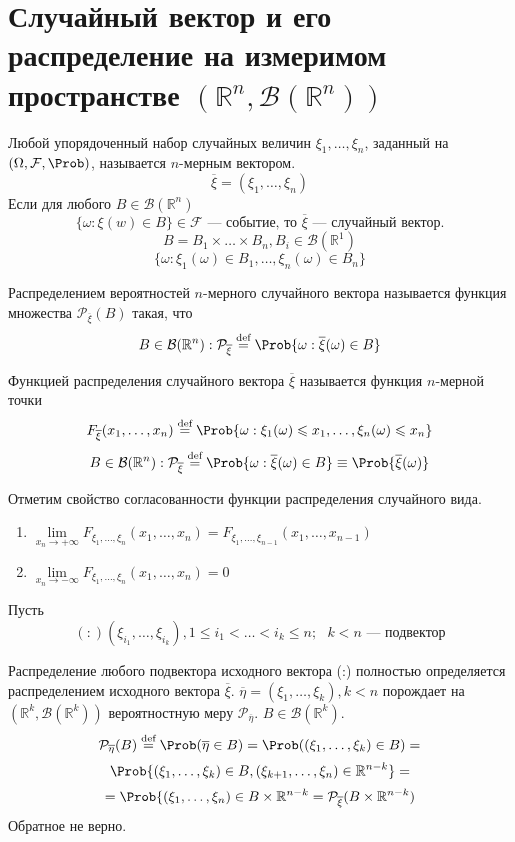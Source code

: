 \section{Случайный вектор и его распределение на измеримом пространстве $(\mathbb{R}^n, \mathcal{B}(\mathbb{R}^n))$}
\begin{definition}
	Любой упорядоченный набор случайных величин $\xi_1, \ldots, \xi_n$, заданный на $(\Omega, \mathcal{F}, \Prob)$, называется $n$-мерным вектором.
	\[
		\overline{\xi} = (\xi_1, \ldots, \xi_n)
	\]
	Если для любого $B \in \mathcal{B}(\mathbb{R}^n)$
	\[
		\{ \omega: \xi (w) \in B \} \in \mathcal{F} \text{ --- событие, то $\overline{\xi}$ --- случайный вектор.}
	\]
	\[
		B = B_1 \times \ldots \times B_n, B_i \in \mathcal{B} (\mathbb{R}^1)
	\]
	\[
		\{ \omega : \xi_1 (\omega) \in B_1, \ldots, \xi_n (\omega) \in B_n \}
	\]
\end{definition}
\begin{definition}
	Распределением вероятностей $n$-мерного случайного вектора называется функция множества $\mathcal{P}_{\overline{\xi}} (B)$ такая, что
	\[
		B \in \mathcal{B} (\mathbb{R}^n) : \mathcal{P}_{\overline{\xi}} \overset{\textrm{def}}{=} \Prob \{ \omega : \overline{\xi} (\omega) \in B \}
	\]
\end{definition}
\begin{definition}
	Функцией распределения случайного вектора $\overline{\xi}$ называется функция $n$-мерной точки
	\[
		F_{\overline{\xi}} (x_1, \ldots, x_n) \overset{\textrm{def}}{=} \Prob \{\omega : \xi_1 (\omega) \leqslant x_1, \ldots, \xi_n (\omega) \leqslant x_n \}
	\]
	\[
		B \in \mathcal{B} (\mathbb{R}^n) : \mathcal{P}_{\overline{\xi}} \overset{\textrm{def}}{=} \Prob \{ \omega : \overline{\xi} (\omega) \in B \} \equiv \Prob \{ \overline{\xi} (\omega) \}
	\]
\end{definition}
Отметим свойство согласованности функции распределения случайного вида.
\begin{enumerate}
	\item $\lim\limits_{x_n \to +\infty} F_{\xi_1, \ldots, \xi_n} (x_1, \ldots, x_n) = F_{\xi_1, \ldots, \xi_{n-1}} (x_1, \ldots, x_{n-1})$
	\item $\lim\limits_{x_n \to -\infty} F_{\xi_1, \ldots, \xi_n} (x_1, \ldots, x_n) = 0$
\end{enumerate}
Пусть
\[
 (:) (\xi_{i_1}, \ldots, \xi_{i_k}), 1 \leqslant i_1 < \ldots < i_k \leqslant n; \text{ $k < n$ --- подвектор}
\]
\begin{lemma}
	Распределение любого подвектора исходного вектора (:) полностью определяется распределением исходного вектора $\overline{\xi}$.
	$\overline{\eta} = (\xi_1, \ldots, \xi_k), k < n$ порождает на $(\mathbb{R}^k, \mathcal{B}(\mathbb{R}^k))$ вероятностную меру $\mathcal{P}_{\overline{\eta}}$. $B \in \mathcal{B}(\mathbb{R}^k)$.
\[
		\mathcal{P}_{\overline{\eta}}(B) \overset{\textrm{def}}{=} \Prob(\overline{\eta} \in B) = \Prob ((\xi_1, \ldots, \xi_k) \in B) =
\]
\[
	\Prob \{(\xi_1, \ldots, \xi_k) \in B, (\xi_{k+1}, \ldots, \xi_n) \in \mathbb{R}^{n-k} \} =
\]
\[
	 = \Prob \{(\xi_1, \ldots, \xi_n) \in B \times \mathbb{R}^{n-k} = \mathcal{P}_{\overline{\xi}} (B \times \mathbb{R}^{n-k})
\]
Обратное не верно.
\end{lemma}
